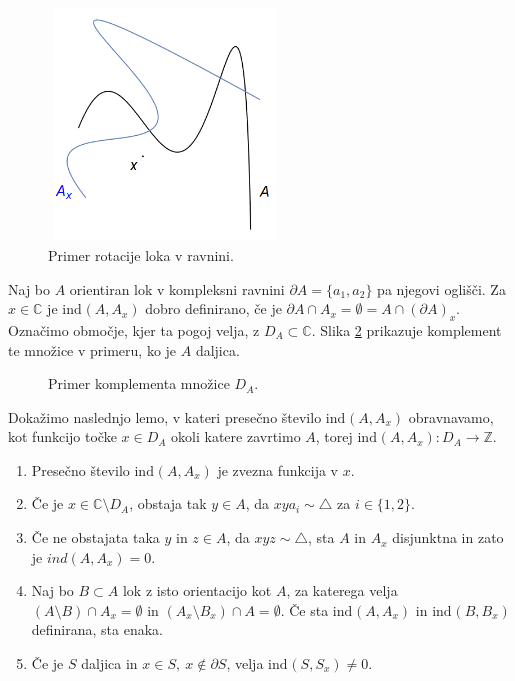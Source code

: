 \documentclass[mat1]{fmfdelo}
\newcommand{\R}{\mathbb R}
\newcommand{\Z}{\mathbb Z}
\newcommand{\C}{\mathbb C}
\newcommand{\ind}[3][]{\text{ind}_{#1}(#2, #3)}
\begin{document}
\begin{figure}[h!]
\centering
\includegraphics[width = 175pt, height = 175pt]{rotacija_zacetna.png}
\caption{Primer rotacije loka v ravnini.}
\label{fig:rotacija_osnovna}
\end{figure}

Naj bo $A$ orientiran lok v kompleksni ravnini $\partial A = \{a_1, a_2\}$ pa njegovi oglišči. Za $x\in \C$ je $\ind{A}{A_x}$ dobro definirano, če je $\partial A \cap A_x = \emptyset = A \cap (\partial A)_x$. Označimo območje, kjer ta pogoj velja, z $D_A \subset \C$. Slika \ref{fig:kompl_d_a} prikazuje komplement te množice v primeru, ko je $A$ daljica.

\begin{figure}[h!]
\centering
{}
\caption{Primer komplementa množice $D_A$.}
\label{fig:kompl_d_a}
\end{figure}


Dokažimo naslednjo lemo, v kateri presečno število $\ind{A}{A_x}$ obravnavamo, kot funkcijo točke $x \in D_A$ okoli katere zavrtimo $A$, torej $\ind{A}{A_x} \colon D_A \to \Z$.

\begin{lema}\label{le:lema2}
\begin{enumerate}
\item Presečno število $\ind{A}{A_x}$ je zvezna funkcija v $x$.
\item Če je $x \in \C \setminus D_A$, obstaja tak $y \in A$, da $xya_i \sim \triangle$ za $i \in \{1, 2\}$.
\item Če ne obstajata taka $y$ in $z \in A$, da $xyz \sim \triangle$, sta $A$ in $A_x$ disjunktna in zato je $ind(A, A_x) = 0$.
\item Naj bo $B \subset A$ lok z isto orientacijo kot $A$, za katerega velja $(A \setminus B) \cap A_x = \emptyset$ in $(A_x \setminus B_x) \cap A = \emptyset$. Če sta $\ind{A}{A_x}$ in $\ind{B}{B_x}$ definirana, sta enaka.
\item Če je $S$ daljica in $x \in S,\ x \notin \partial S$, velja $\ind{S}{S_x} \neq 0$.
\end{enumerate}
\end{lema}
\end{document}
